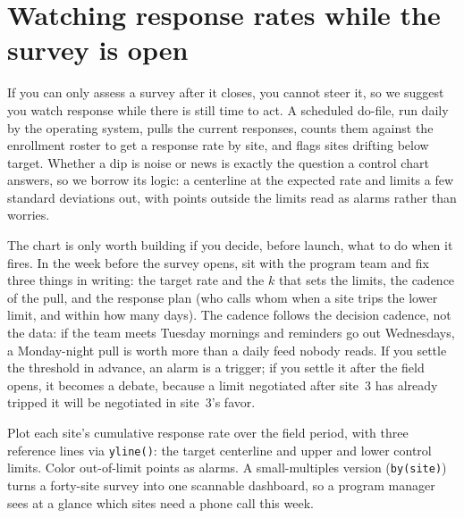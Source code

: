 \documentclass[
    a4paper,
    fontsize=10pt,
    twoside=true,
    numbers=noenddot,
]{kaobook}
\newenvironment{vizcallout}[1][Visualization to build]{%
    \begin{vizbox}[frametitle={#1}]%
}{%
    \end{vizbox}%
}
\begin{document}
\section{Watching response rates while the survey is open}\label{sec:monitor}
If you can only assess a survey after it closes, you cannot steer it, so we suggest you watch response while there is still time to act. A scheduled do-file, run daily by the operating system, pulls the current responses, counts them against the enrollment roster to get a response rate by site, and flags sites drifting below target. Whether a dip is noise or news is exactly the question a control chart answers, so we borrow its logic: a centerline at the expected rate and limits a few standard deviations out, with points outside the limits read as alarms rather than worries.

The chart is only worth building if you decide, before launch, what to do when it fires. In the week before the survey opens, sit with the program team and fix three things in writing: the target rate and the $k$ that sets the limits, the cadence of the pull, and the response plan (who calls whom when a site trips the lower limit, and within how many days). The cadence follows the decision cadence, not the data: if the team meets Tuesday mornings and reminders go out Wednesdays, a Monday-night pull is worth more than a daily feed nobody reads. If you settle the threshold in advance, an alarm is a trigger; if you settle it after the field opens, it becomes a debate, because a limit negotiated after site~3 has already tripped it will be negotiated in site~3's favor.

\begin{vizcallout}[Visualization to build: the response-rate control chart]
Plot each site's cumulative response rate over the field period, with three reference lines via \texttt{yline()}: the target centerline and upper and lower control limits. Color out-of-limit points as alarms. A small-multiples version (\texttt{by(site)}) turns a forty-site survey into one scannable dashboard, so a program manager sees at a glance which sites need a phone call this week.
\end{vizcallout}
\end{document}
